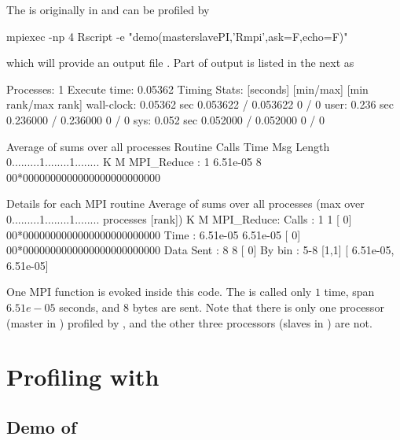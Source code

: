 The  is originally in  and can be
profiled by
\begin{Code}
mpiexec -np 4 Rscript -e "demo(masterslavePI,'Rmpi',ask=F,echo=F)"
\end{Code}
which will provide an output file .
Part of output is listed in the next as
\begin{Output}
Processes:	1
Execute time:	0.05362
Timing Stats: [seconds]	[min/max]    	[min rank/max rank]
wall-clock: 0.05362 sec	0.053622 / 0.053622	0 / 0
user: 0.236 sec	0.236000 / 0.236000	0 / 0
sys: 0.052 sec	0.052000 / 0.052000	0 / 0

Average of sums over all processes
Routine                 Calls       Time Msg Length    %
0.........1........1........
K        M
MPI_Reduce          :       1   6.51e-05          8 00*0000000000000000000000000

Details for each MPI routine
Average of sums over all processes
(max over          0.........1........1........
 processes [rank])           K        M
MPI_Reduce:
Calls     :          1            1 [   0] 00*0000000000000000000000000
Time      :   6.51e-05     6.51e-05 [   0] 00*0000000000000000000000000
Data Sent :          8            8 [   0]
By bin    : 5-8	[1,1]	[  6.51e-05,  6.51e-05]
\end{Output}
One MPI  function  is
evoked inside this  code. The  is called only $1$
time, span $6.51e-05$ seconds, and $8$ bytes are sent.
Note that there is only one processor (master in )
profiled by , and the other three processors
(slaves in ) are not.




\section{Profiling with }
\label{sec:ex_mpiP}

\subsection{Demo of }

